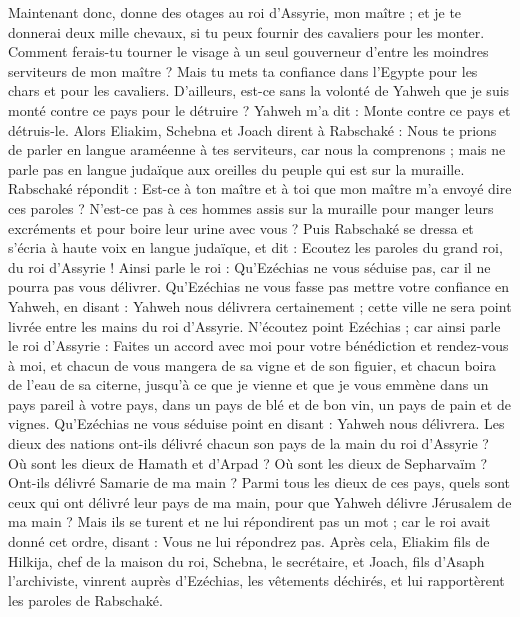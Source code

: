 \begin{multicols}{2}
Maintenant donc, donne des otages au roi d'Assyrie, mon maître ; et je te donnerai deux mille chevaux, si tu peux fournir des cavaliers pour les monter.
Comment ferais-tu tourner le visage à un seul gouverneur d'entre les moindres serviteurs de mon maître ? Mais tu mets ta confiance dans l'Egypte pour les chars et pour les cavaliers.
D'ailleurs, est-ce sans la volonté de Yahweh que je suis monté contre ce pays pour le détruire ? Yahweh m'a dit : Monte contre ce pays et détruis-le.
Alors Eliakim, Schebna et Joach dirent à Rabschaké : Nous te prions de parler en langue araméenne à tes serviteurs, car nous la comprenons ; mais ne parle pas en langue judaïque aux oreilles du peuple qui est sur la muraille.
Rabschaké répondit : Est-ce à ton maître et à toi que mon maître m'a envoyé dire ces paroles ? N'est-ce pas à ces hommes assis sur la muraille pour manger leurs excréments et pour boire leur urine avec vous ?
Puis Rabschaké se dressa et s'écria à haute voix en langue judaïque, et dit : Ecoutez les paroles du grand roi, du roi d'Assyrie !
Ainsi parle le roi : Qu'Ezéchias ne vous séduise pas, car il ne pourra pas vous délivrer.
Qu'Ezéchias ne vous fasse pas mettre votre confiance en Yahweh, en disant : Yahweh nous délivrera certainement ; cette ville ne sera point livrée entre les mains du roi d'Assyrie.
N'écoutez point Ezéchias ; car ainsi parle le roi d'Assyrie : Faites un accord avec moi pour votre bénédiction et rendez-vous à moi, et chacun de vous mangera de sa vigne et de son figuier, et chacun boira de l'eau de sa citerne,
jusqu'à ce que je vienne et que je vous emmène dans un pays pareil à votre pays, dans un pays de blé et de bon vin, un pays de pain et de vignes.
Qu'Ezéchias ne vous séduise point en disant : Yahweh nous délivrera. Les dieux des nations ont-ils délivré chacun son pays de la main du roi d'Assyrie ?
Où sont les dieux de Hamath et d'Arpad ? Où sont les dieux de Sepharvaïm ? Ont-ils délivré Samarie de ma main ?
Parmi tous les dieux de ces pays, quels sont ceux qui ont délivré leur pays de ma main, pour que Yahweh délivre Jérusalem de ma main ?
Mais ils se turent et ne lui répondirent pas un mot ; car le roi avait donné cet ordre, disant : Vous ne lui répondrez pas.
Après cela, Eliakim fils de Hilkija, chef de la maison du roi, Schebna, le secrétaire, et Joach, fils d'Asaph l'archiviste, vinrent auprès d'Ezéchias, les vêtements déchirés, et lui rapportèrent les paroles de Rabschaké.

\end{multicols}

